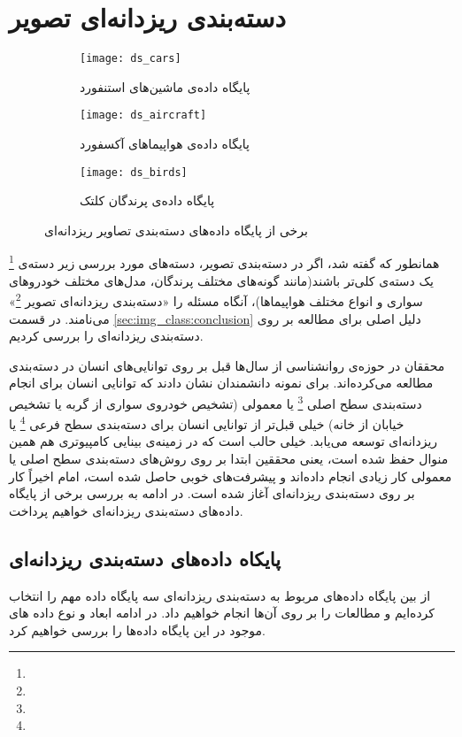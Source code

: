 \documentclass[11pt]{article}
\begin{document}
\section{دسته‌بندی ریزدانه‌ای تصویر}\label{sec:fg_class}
\begin{figure}[t!]
	\centering
	\begin{subfigure}[h]{0.5\textwidth}
		\centering
		\texttt{[image: ds\_cars]}
		\caption{پایگاه داده‌ی ماشین‌های استنفورد}
		\label{fig:fg_class:ds:cars}
	\end{subfigure}
	\begin{subfigure}[h]{0.5\textwidth}
		\centering
		\texttt{[image: ds\_aircraft]}
		\caption{پایگاه داده‌ی هواپیماهای آکسفورد}
		\label{fig:fg_class:ds:aircraft}
	\end{subfigure}
	\begin{subfigure}[h]{0.5\textwidth}
		\centering
		\texttt{[image: ds\_birds]}
		\caption{پایگاه داده‌ی پرندگان کلتک}
		\label{fig:fg_class:ds:birds}
	\end{subfigure}
	\caption{برخی از پایگاه داده‌های دسته‌بندی تصاویر ریزدانه‌ای}
	\label{fig:fg_class:ds}
\end{figure}
همانطور که گفته شد، اگر در دسته‌بندی تصویر، دسته‌های مورد بررسی زیر دسته‌ی
\footnote{}
یک دسته‌ی کلی‌تر باشند(مانند گونه‌های مختلف پرندگان، مدل‌های مختلف خودروهای سواری و انواع مختلف هواپیماها)، آنگاه مسئله را «دسته‌بندی ریزدانه‌ای تصویر
\footnote{}»
می‌نامند. در قسمت
\ref{sec:img_class:conclusion}
دلیل اصلی برای مطالعه بر روی دسته‌بندی ریزدانه‌ای را بررسی کردیم.

محققان در حوزه‌ی روانشناسی از سال‌ها قبل بر روی توانایی‌های انسان در دسته‌بندی مطالعه می‌کرده‌اند. برای نمونه دانشمندان نشان دادند
\cite{johnson1998}
که توانایی انسان برای انجام دسته‌بندی سطح اصلی
\footnote{}
یا معمولی (تشخیص خودروی سواری از گربه یا تشخیص خیابان از خانه) خیلی قبل‌تر از توانایی انسان برای دسته‌بندی سطح فرعی
\footnote{}
یا ریزدانه‌ای توسعه می‌یابد. خیلی حالب است که در زمینه‌ی بینایی کامپیوتری هم همین منوال حفظ شده است، یعنی محققین ابتدا بر روی روش‌های دسته‌بندی سطح اصلی یا معمولی کار زیادی انجام داده‌اند و پیشرفت‌های خوبی حاصل شده است، امام اخیراً کار بر روی دسته‌بندی ریزدانه‌ای آغاز شده است. در ادامه به بررسی برخی از پایگاه داده‌های دسته‌بندی ریزدانه‌ای خواهیم پرداخت.

\subsection{پایکاه داده‌های دسته‌بندی ریزدانه‌ای}\label{sec:fg_class:datasets}
از بین پایگاه داده‌های مربوط به دسته‌بندی ریزدانه‌ای سه پایگاه داده مهم را انتخاب کرده‌ایم و مطالعات را بر روی آن‌ها انجام خواهیم داد. در ادامه ابعاد و نوع داده های موجود در این پایگاه داده‌ها را بررسی خواهیم کرد.
\end{document}
